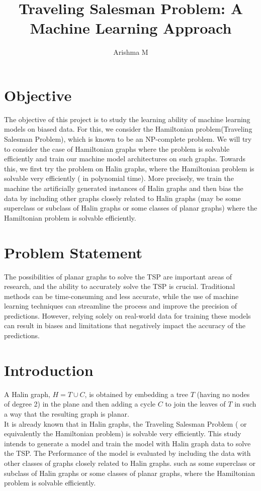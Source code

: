 \documentclass{article}
\title{Traveling Salesman Problem: A Machine Learning Approach}
\author{Arishma M \\}
\begin{document}
\maketitle

\section{Objective}
The objective of this project is to study the learning ability of machine learning models on  biased data. For this, we consider the Hamiltonian problem(Traveling Salesman Problem), which is known to be an NP-complete problem. We will try to consider the case of Hamiltonian graphs where the problem is solvable efficiently and train our machine model architectures on such graphs. Towards this, we first try the problem on Halin graphs, where the Hamiltonian problem is solvable very efficiently ( in polynomial time). More precisely, we train the machine the artificially generated instances of Halin graphs and then bias the data by including other graphs closely related to Halin graphs (may be some superclass or subclass of Halin graphs or some classes of planar graphs) where the Hamiltonian problem is solvable efficiently. 

\section{Problem Statement}
The possibilities of planar graphs to solve the TSP are important areas of research, and the ability to accurately solve the TSP is crucial. Traditional methods can be time-consuming and less accurate, while the use of machine learning techniques can streamline the process and improve the precision of predictions. However, relying solely on real-world data for training these models can result in biases and limitations that negatively impact the accuracy of the predictions.

\section{Introduction}
    A Halin graph, $H=T\cup C$, is obtained by embedding a tree $T$ (having no nodes of degree 2) in the plane and then adding a cycle $C$ to join the leaves of $T$ in such a way that the resulting graph is planar.\\

It is already known that in  Halin graphs,  the Traveling Salesman Problem ( or equivalently the Hamiltonian problem) is solvable very efficiently. This study intends to generate  a model and train the model with Halin graph  data to solve the TSP.
The Performance of the model  is evaluated by including the data with other classes of graphs closely related to Halin graphs. 
such as  some superclass or subclass of Halin graphs or some classes of planar graphs, where the Hamiltonian problem is solvable efficiently. 
\end{document}
